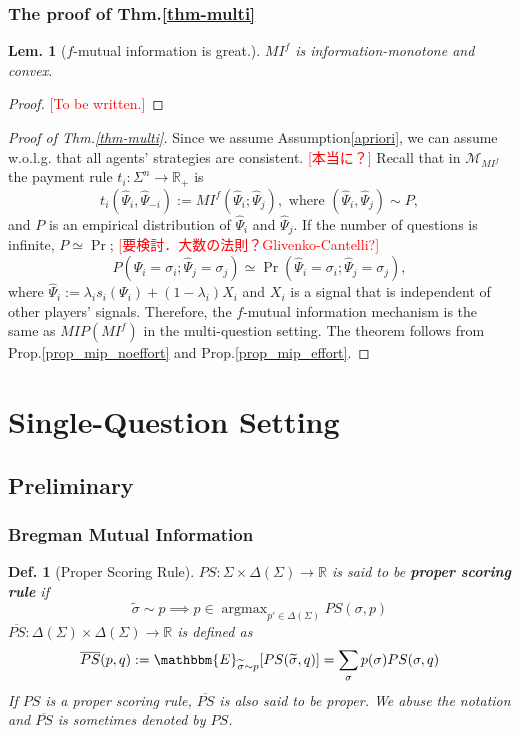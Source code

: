 \documentclass[11pt,a4paper,dvipdfmx]{article}
\theoremstyle{plain}
\newtheorem{lem}{Lem.}[section]
\newtheorem{df}{Def.}[section]
\newcommand{\R}{\mathbb{R}}
\newcommand{\mM}{\mathcal{M}}
\renewcommand{\hat}{\widehat}
\renewcommand{\tilde}{\widetilde}
\renewcommand{\bar}{\overline}
\newcommand{\E}{\mathbbm{E}}
\newcommand{\1}{\mathbbm{1}}
\DeclareMathOperator*{\argmax}{argmax}
\newcommand{\ocomment}[1]{{\textcolor{red}{#1}}}
\begin{document}
\subsubsection{The proof of Thm.\ref{thm-multi}}
\begin{lem}[$f$-mutual information is great.]
	$MI^f$ is information-monotone and convex.
\end{lem}
\begin{proof}
	\ocomment{[To be written.]}
\end{proof}
\begin{proof}[Proof of Thm.\ref{thm-multi}]
Since we assume Assumption\ref{apriori}, we can assume w.o.l.g. that all agents' strategies are consistent. \ocomment{[本当に？]} 
	Recall that in $\mM_{MI^f}$ the payment rule $t_i: \Sigma^{n} \to \R_+$ is
\[
t_i(\hat{\Psi}_{i}, \hat{\Psi}_{-i}) := MI^f(\hat{\Psi}_i ; \hat{\Psi}_j), \text{ where $(\hat{\Psi}_i, \hat{\Psi}_j) \sim P$},
\]
and $P$ is an empirical distribution of $\hat{\Psi}_i$ and $\hat{\Psi}_j$. If the number of questions is infinite, $P \simeq \Pr$; \ocomment{[要検討．大数の法則？Glivenko-Cantelli?]}
\[
	P(\hat{\Psi}_i = \sigma_i; \hat{\Psi}_j = \sigma_j) \simeq \Pr(\hat{\Psi}_i = \sigma_i; \hat{\Psi}_j = \sigma_j),
\]
where $\hat{\Psi}_i := \lambda_i s_i(\Psi_i) + (1 - \lambda_i) X_i$ and $X_i$ is a signal that is independent of other players' signals.
Therefore, the $f$-mutual information mechanism is the same as $MIP(MI^f)$ in the multi-question setting. The theorem follows from Prop.\ref{prop_mip_noeffort} and Prop.\ref{prop_mip_effort}.
\end{proof}


\section{Single-Question Setting}
\subsection{Preliminary}
\subsubsection{Bregman Mutual Information}
\begin{df}[Proper Scoring Rule]
	$PS: \Sigma \times \Delta(\Sigma) \to \R$ is said to be \textbf{proper scoring rule} if
	$$
	\tilde{\sigma} \sim p \implies p \in \argmax_{p' \in \Delta(\Sigma)} PS(\sigma, p)
	$$
	$\bar{PS}: \Delta(\Sigma) \times \Delta(\Sigma) \to \R$ is defined as
	$$
	\bar{PS}(p, q) := \E_{\tilde{\sigma} \sim p}[PS(\tilde{\sigma},q)]
	= \sum_{\sigma} p(\sigma) PS(\sigma, q)
	$$
	If $PS$ is a proper scoring rule, $\bar{PS}$ is also said to be proper. We abuse the notation and $\bar{PS}$ is sometimes denoted by $PS$.
\end{df}
\end{document}
